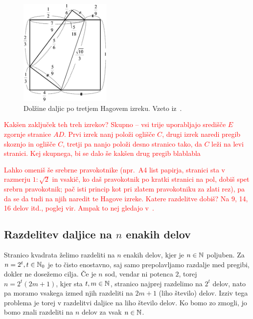 \begin{figure}[h]
    \centering
    \includegraphics[width=0.4\textwidth]{images/hagovi_izreki/hagov_izrek3_stevilke.png}
    \caption[Tretji Hagov izrek v številkah]{Dolžine daljic po tretjem Hagovem izreku. Vzeto iz~\cite[str. 19]{haga2008}.}
    \label{fig:hagov_izrek3_st}
\end{figure}


\textcolor{red}{Kakšen zaključek teh treh izrekov? Skupno -- vsi trije uporabljajo središče $E$ zgornje stranice $AD$. Prvi izrek nanj položi oglišče $C$, drugi izrek naredi pregib skoznjo in oglišče $C$, tretji pa nanjo položi desno stranico tako, da $C$ leži na levi stranici. Kej skupnega, bi se dalo še kakšen drug pregib blablabla}

\textcolor{red}{Lahko omeniš še srebrne pravokotnike (npr.\ A4 list papirja, stranici sta v razmerju $1 : \sqrt{2}$ in vsakič, ko daš pravokotnik po kratki stranici na pol, dobiš spet srebrn pravokotnik; pač isti princip kot pri zlatem pravokotniku za zlati rez), pa da se da tudi na njih naredit te Hagove izreke. Katere razdelitve dobiš? Na 9, 14, 16 delov itd., poglej vir. Ampak to nej gledajo v~\cite[str.\ 21--32]{haga2008}.}



\subsection{Razdelitev daljice na $n$ enakih delov}

Stranico kvadrata želimo razdeliti na $n$ enakih delov, kjer je $n \in \mathbb N$ poljuben. Za $n = 2^t, t \in \mathbb N_0$ je to čisto enostavno, saj samo prepolavljamo razdalje med pregibi, dokler ne dosežemo cilja. Če je $n$ sod, vendar ni potenca $2$, torej $n = 2^t(2m + 1)$, kjer sta $t, m \in \mathbb N$, stranico najprej razdelimo na $2^t$ delov, nato pa moramo vsakega izmed njih razdeliti na $2m + 1$ (liho število) delov. Izziv tega problema je torej v razdelitvi daljice na liho število delov. Ko bomo zo zmogli, jo bomo znali razdeliti na $n$ delov za vsak $n \in \mathbb N$.

